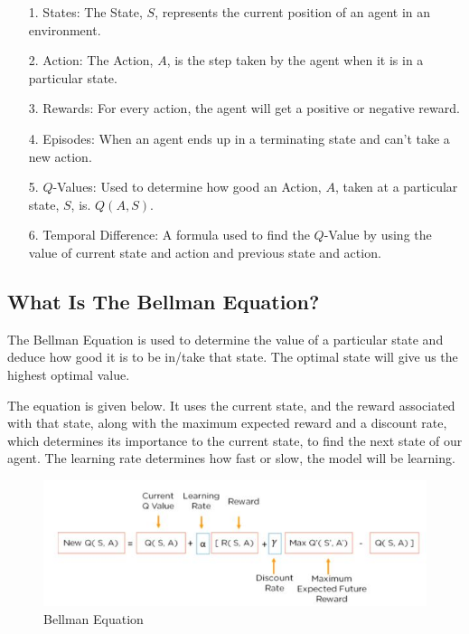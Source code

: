 \begin{itemize}
\setlength{\parskip}{0pt}
\item[1.]
States: The State, $S$, represents the current position of an agent in an environment.
\item[2.]
Action: The Action, $A$, is the step taken by the agent when it is in a particular state.
\item[3.]
Rewards: For every action, the agent will get a positive or negative reward.
\item[4.]
Episodes: When an agent ends up in a terminating state and can't take a new action.
\item[5.]
$Q$-Values: Used to determine how good an Action, $A$, taken at a particular state, $S$, 
is. $Q (A, S)$.
\item[6.]
Temporal Difference: A formula used to find the $Q$-Value by using the value of current 
state and action and previous state and action.
\end{itemize}


\subsection{What Is The Bellman Equation?}

The Bellman Equation is used to determine the value of a particular state and deduce 
how good it is to be in/take that state. The optimal state will give us the highest 
optimal value. 

The equation is given below. It uses the current state, and the reward associated with 
that state, along with the maximum expected reward and a discount rate, which determines 
its importance to the current state, to find the next state of our agent. The learning 
rate determines how fast or slow, the model will be learning. 

\begin{figure}[!htb]
\centering
\includegraphics[scale=0.618]{pix/q_learning/6-bellman.jpg}
\caption{Bellman Equation}
\end{figure}


